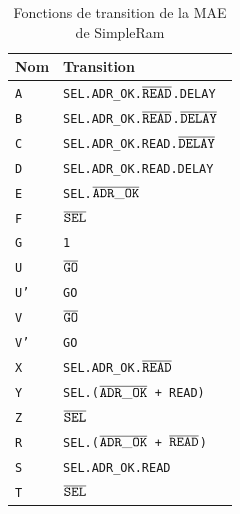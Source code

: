 \documentclass{article}
\begin{document}
\begin{table}[!htb]
\centering
\begingroup
\setlength{\tabcolsep}{5pt}
\renewcommand{\arraystretch}{1.1}
\begin{tabular}{ | l | l | }
\hline
Nom    &   Transition  \\
\hline
\texttt{A}  &   \tt{SEL.ADR\_OK.$\overline{\tt{READ}}$.DELAY                     }\\
\texttt{B}  &   \tt{SEL.ADR\_OK.$\overline{\tt{READ}}$.$\overline{\tt{DELAY}}$        }\\
\texttt{C}  &   \tt{SEL.ADR\_OK.READ.$\overline{\tt{DELAY}}$                     }\\
\texttt{D}  &   \tt{SEL.ADR\_OK.READ.DELAY                                  }\\
\texttt{E}  &   \tt{SEL.$\overline{\tt{ADR\_OK}}$                                }\\
\texttt{F}  &   \tt{$\overline{\tt{SEL}}$                                        }\\
\texttt{G}  &   \tt{1                                                       }\\
\hline
\texttt{U}  &   \tt{$\overline{\tt{GO}}$                                         }\\
\texttt{U'} &   \tt{GO                                                      }\\
\hline
\texttt{V}  &   \tt{$\overline{\tt{GO}}$                                         }\\
\texttt{V'} &   \tt{GO                                                      }\\
\hline
\texttt{X}  &   \tt{SEL.ADR\_OK.$\overline{\tt{READ}}$                           }\\
\texttt{Y}  &   \tt{SEL.($\overline{\tt{ADR\_OK}}$ + READ)                       }\\
\texttt{Z}  &   \tt{$\overline{\tt{SEL}}$                                        }\\
\hline
\texttt{R}  &   \tt{SEL.($\overline{\tt{ADR\_OK}}$ + $\overline{\tt{READ}}$)          }\\
\texttt{S}  &   \tt{SEL.ADR\_OK.READ                                        }\\
\texttt{T}  &   \tt{$\overline{\tt{SEL}}$                                        }\\
\hline
\end{tabular}
\caption{Fonctions de transition de la MAE de SimpleRam}
\endgroup
\end{table}
\end{document}
